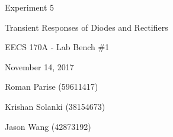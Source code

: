 \begin{titlepage}
	\centering
	\vspace{2.5cm}
	{\huge Experiment 5 \par}
	{\LARGE Transient Responses of Diodes and Rectifiers  \par}
	\vspace{1cm}
	{\Large EECS 170A - Lab Bench \#1 \par}
	{\Large November 14, 2017 \par}
	\vspace{1cm}
	{\large Roman Parise (59611417) \par}
	{\large Krishan Solanki (38154673) \par}
	{\large Jason Wang (42873192) \par}
	\vspace{1cm}
\end{titlepage}

